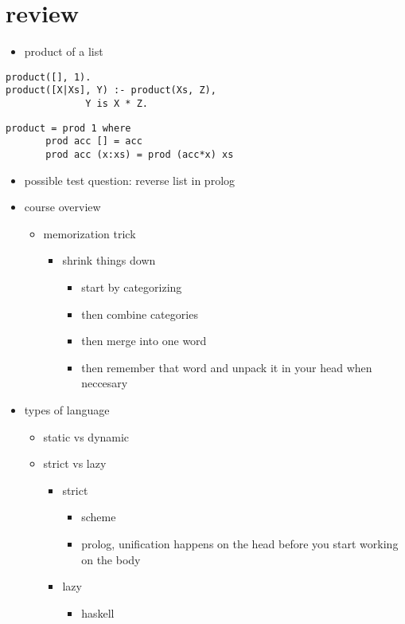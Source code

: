 \documentclass[11pt]{article}
\begin{document}
\section{review}
\label{sec-23}
\begin{itemize}
\item product of a list
\end{itemize}
\begin{verbatim}
product([], 1).
product([X|Xs], Y) :- product(Xs, Z),
		      Y is X * Z.
\end{verbatim}
\begin{verbatim}
product = prod 1 where 
       prod acc [] = acc
       prod acc (x:xs) = prod (acc*x) xs
\end{verbatim}
\begin{itemize}
\item possible test question: reverse list in prolog
\item course overview
\begin{itemize}
\item memorization trick
\begin{itemize}
\item shrink things down
\begin{itemize}
\item start by categorizing
\item then combine categories
\item then merge into one word
\item then remember that word and unpack it in your head when neccesary
\end{itemize}
\end{itemize}
\end{itemize}
\item types of language
\begin{itemize}
\item static vs dynamic
\item strict vs lazy
\begin{itemize}
\item strict
\begin{itemize}
\item scheme
\item prolog, unification happens on the head before you start working on the body
\end{itemize}
\item lazy
\begin{itemize}
\item haskell
\end{itemize}

\end{itemize}
\end{itemize}
\end{itemize}
\end{document}
